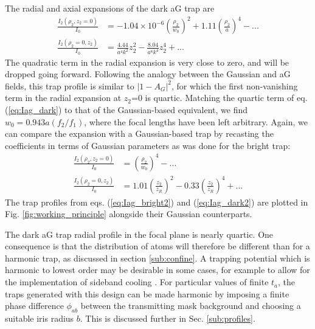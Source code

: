 The radial and axial expansions of the dark aG trap are  
\begin{equation} \label{eq:Iag_dark}
    \begin{aligned}
    \frac{I_2(\rho_2,z_2=0)}{I_0} &= -1.04\times10^{-6} \left(\frac{\rho_2}{w_0}\right)^2 + 1.11 \left(\frac{\rho_2}{a}\right)^4 - ... \\
    \frac{I_2(\rho_2=0,z_2)}{I_0} &= \frac{4.44}{a^4 k^2}z_2^2 - \frac{8.04 }{a^8 k^4}z_2^4 + ...
    \end{aligned}
\end{equation}
 The quadratic term in the radial expansion is very close to zero, and will be dropped going forward. Following the analogy between the Gaussian and aG fields, this trap profile is similar to $|1 - A_G|^2$, for which the first non-vanishing term in the radial expansion at $z_2$=0 is quartic. Matching the quartic term of eq. (\ref{eq:Iag_dark}) to that of the Gaussian-based equivalent, we find $w_0=0.943a(f_2/f_1)$, where the focal lengths have been left arbitrary. Again, we can compare the expansion with a Gaussian-based trap by recasting the coefficients in terms of Gaussian parameters as was done for the bright trap:
\begin{equation} \label{eq:Iag_dark2}
    \begin{aligned}
    \frac{I_2(\rho_2,z_2=0)}{I_0} &= \left(\frac{\rho_2}{w_0}\right)^4 - ... \\
    \frac{I_2(\rho_2=0,z_2)}{I_0} &= 1.01\left(\frac{z_2}{z_R}\right)^2 - 0.33 \left(\frac{z_2}{z_R}\right)^4 + ...
    \end{aligned}
\end{equation}
The trap profiles from eqs. (\ref{eq:Iag_bright2}) and (\ref{eq:Iag_dark2}) are plotted in Fig. \ref{fig:working_principle} alongside their Gaussian counterparts.

The dark aG trap radial profile in the focal plane is nearly quartic. One consequence is that the distribution of atoms will therefore be different than for a harmonic trap, as discussed in section \ref{sub:confine}. A trapping potential which is harmonic to lowest order may be desirable in some cases, for example to allow for the implementation of sideband cooling \cite{Wineland1979}. For particular values of finite $t_a$, the traps generated with this design can be made harmonic by imposing a finite phase difference $\phi_{ab}$ between the transmitting mask background and choosing a suitable iris radius $b$. This is discussed further in Sec. \ref{sub:profiles}.

